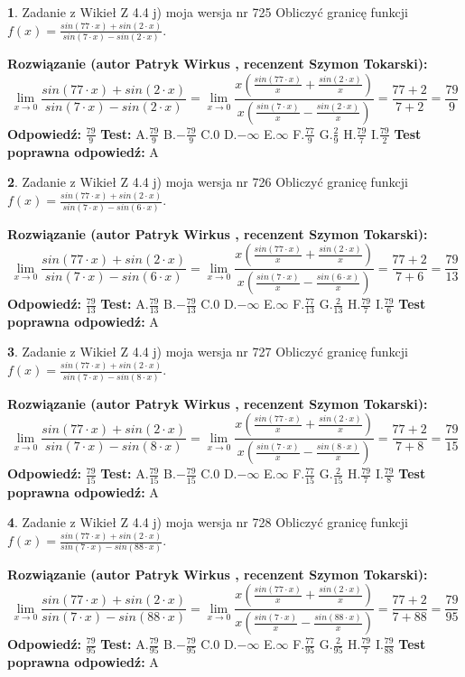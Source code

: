 \documentclass[12pt, a4paper]{article}
\theoremstyle{definition} %
\newtheorem{zad}{}
\newcommand{\zadStart}[1]{\begin{zad}#1\newline}
\newcommand{\zadStop}{\end{zad}}
\newcommand{\rozwStart}[2]{\noindent \textbf{Rozwiązanie (autor #1 , recenzent #2): }\newline}
\newcommand{\rozwStop}{\newline}
\newcommand{\odpStart}{\noindent \textbf{Odpowiedź:}\newline}
\newcommand{\odpStop}{\newline}
\newcommand{\testStart}{\noindent \textbf{Test:}\newline}
\newcommand{\testStop}{\newline}
\newcommand{\kluczStart}{\noindent \textbf{Test poprawna odpowiedź:}\newline}
\newcommand{\kluczStop}{\newline}
\begin{document}
\zadStart{Zadanie z Wikieł Z 4.4 j) moja wersja nr 725}
Obliczyć granicę funkcji $f(x)=\frac{sin(77\cdot x) +sin(2\cdot x)}{sin(7\cdot x) -sin(2\cdot x)}$.
\zadStop
\rozwStart{Patryk Wirkus}{Szymon Tokarski}
$$\lim\limits_{x\to 0}\frac{sin(77\cdot x) +sin(2\cdot x)}{sin(7\cdot x) -sin(2\cdot x)}=\lim\limits_{x\to 0}\frac{x(\frac{sin(77\cdot x)}{x}+\frac{sin(2\cdot x)}{x})}{x(\frac{sin(7\cdot x)}{x}-\frac{sin(2\cdot x)}{x})}=\frac{77+2}{7+2} = \frac{79}{9}$$
\rozwStop
\odpStart
$\frac{79}{9}$
\odpStop
\testStart
A.$\frac{79}{9}$
B.$-\frac{79}{9}$
C.$0$
D.$-\infty$
E.$\infty$
F.$\frac{77}{9}$
G.$\frac{2}{9}$
H.$\frac{79}{7}$
I.$\frac{79}{2}$
\testStop
\kluczStart
A
\kluczStop



\zadStart{Zadanie z Wikieł Z 4.4 j) moja wersja nr 726}
Obliczyć granicę funkcji $f(x)=\frac{sin(77\cdot x) +sin(2\cdot x)}{sin(7\cdot x) -sin(6\cdot x)}$.
\zadStop
\rozwStart{Patryk Wirkus}{Szymon Tokarski}
$$\lim\limits_{x\to 0}\frac{sin(77\cdot x) +sin(2\cdot x)}{sin(7\cdot x) -sin(6\cdot x)}=\lim\limits_{x\to 0}\frac{x(\frac{sin(77\cdot x)}{x}+\frac{sin(2\cdot x)}{x})}{x(\frac{sin(7\cdot x)}{x}-\frac{sin(6\cdot x)}{x})}=\frac{77+2}{7+6} = \frac{79}{13}$$
\rozwStop
\odpStart
$\frac{79}{13}$
\odpStop
\testStart
A.$\frac{79}{13}$
B.$-\frac{79}{13}$
C.$0$
D.$-\infty$
E.$\infty$
F.$\frac{77}{13}$
G.$\frac{2}{13}$
H.$\frac{79}{7}$
I.$\frac{79}{6}$
\testStop
\kluczStart
A
\kluczStop



\zadStart{Zadanie z Wikieł Z 4.4 j) moja wersja nr 727}
Obliczyć granicę funkcji $f(x)=\frac{sin(77\cdot x) +sin(2\cdot x)}{sin(7\cdot x) -sin(8\cdot x)}$.
\zadStop
\rozwStart{Patryk Wirkus}{Szymon Tokarski}
$$\lim\limits_{x\to 0}\frac{sin(77\cdot x) +sin(2\cdot x)}{sin(7\cdot x) -sin(8\cdot x)}=\lim\limits_{x\to 0}\frac{x(\frac{sin(77\cdot x)}{x}+\frac{sin(2\cdot x)}{x})}{x(\frac{sin(7\cdot x)}{x}-\frac{sin(8\cdot x)}{x})}=\frac{77+2}{7+8} = \frac{79}{15}$$
\rozwStop
\odpStart
$\frac{79}{15}$
\odpStop
\testStart
A.$\frac{79}{15}$
B.$-\frac{79}{15}$
C.$0$
D.$-\infty$
E.$\infty$
F.$\frac{77}{15}$
G.$\frac{2}{15}$
H.$\frac{79}{7}$
I.$\frac{79}{8}$
\testStop
\kluczStart
A
\kluczStop



\zadStart{Zadanie z Wikieł Z 4.4 j) moja wersja nr 728}
Obliczyć granicę funkcji $f(x)=\frac{sin(77\cdot x) +sin(2\cdot x)}{sin(7\cdot x) -sin(88\cdot x)}$.
\zadStop
\rozwStart{Patryk Wirkus}{Szymon Tokarski}
$$\lim\limits_{x\to 0}\frac{sin(77\cdot x) +sin(2\cdot x)}{sin(7\cdot x) -sin(88\cdot x)}=\lim\limits_{x\to 0}\frac{x(\frac{sin(77\cdot x)}{x}+\frac{sin(2\cdot x)}{x})}{x(\frac{sin(7\cdot x)}{x}-\frac{sin(88\cdot x)}{x})}=\frac{77+2}{7+88} = \frac{79}{95}$$
\rozwStop
\odpStart
$\frac{79}{95}$
\odpStop
\testStart
A.$\frac{79}{95}$
B.$-\frac{79}{95}$
C.$0$
D.$-\infty$
E.$\infty$
F.$\frac{77}{95}$
G.$\frac{2}{95}$
H.$\frac{79}{7}$
I.$\frac{79}{88}$
\testStop
\kluczStart
A
\kluczStop
\end{document}
